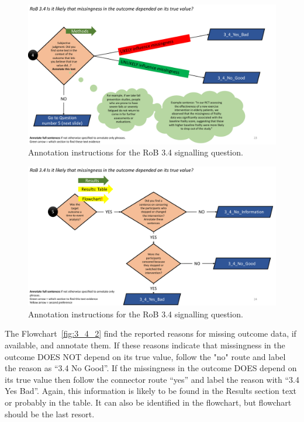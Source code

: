 \documentclass[sn-mathphys,Numbered]{sn-jnl}%
\begin{document}
\begin{figure}[H]
    \centering
    \includegraphics[width=\textwidth]{figures/3_4_4.pdf}
    \caption{Annotation instructions for the RoB 3.4 signalling question.}
    \label{fig:3_4_4}
\end{figure}


\begin{figure}[H]
    \centering
    \includegraphics[width=\textwidth]{figures/3_4_5.pdf}
    \caption{Annotation instructions for the RoB 3.4 signalling question.}
    \label{fig:3_4_5}
\end{figure}
%
%
%

The Flowchart~\ref{fig:3_4_2} find the reported reasons for missing outcome data, if available, and annotate them.
If these reasons indicate that missingness in the outcome DOES NOT depend on its true value, follow the "no" route and label the reason as ``3.4 No Good''.
If the missingness in the outcome DOES depend on its true value then follow the connector route ``yes'' and label the reason with ``3.4 Yes Bad''.
Again, this information is likely to be found in the Results section text or probably in the table. 
It can also be identified in the flowchart, but flowchart should be the last resort.
\end{document}
